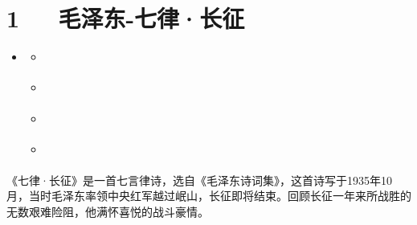 \documentclass[letterpaper,10pt,english]{sphinxmanual}
\begin{document}
\chapter{1   毛泽东-七律·长征}
\label{\detokenize{p01_u6563_u6587/_u6bdb_u6cfd_u4e1c-_u4e03_u5f8b_xb7_u957f_u5f81:id1}}\label{\detokenize{p01_u6563_u6587/_u6bdb_u6cfd_u4e1c-_u4e03_u5f8b_xb7_u957f_u5f81::doc}}
\begin{sphinxShadowBox}
\begin{itemize}
\item {} 
\label{\detokenize{p01_u6563_u6587/_u6bdb_u6cfd_u4e1c-_u4e03_u5f8b_xb7_u957f_u5f81:id7}}{\hyperref[\detokenize{p01_u6563_u6587/_u6bdb_u6cfd_u4e1c-_u4e03_u5f8b_xb7_u957f_u5f81:id1}]{}}
\begin{itemize}
\item {} 
\label{\detokenize{p01_u6563_u6587/_u6bdb_u6cfd_u4e1c-_u4e03_u5f8b_xb7_u957f_u5f81:id8}}{\hyperref[\detokenize{p01_u6563_u6587/_u6bdb_u6cfd_u4e1c-_u4e03_u5f8b_xb7_u957f_u5f81:id3}]{}}

\item {} 
\label{\detokenize{p01_u6563_u6587/_u6bdb_u6cfd_u4e1c-_u4e03_u5f8b_xb7_u957f_u5f81:id9}}{\hyperref[\detokenize{p01_u6563_u6587/_u6bdb_u6cfd_u4e1c-_u4e03_u5f8b_xb7_u957f_u5f81:id4}]{}}

\item {} 
\label{\detokenize{p01_u6563_u6587/_u6bdb_u6cfd_u4e1c-_u4e03_u5f8b_xb7_u957f_u5f81:id10}}{\hyperref[\detokenize{p01_u6563_u6587/_u6bdb_u6cfd_u4e1c-_u4e03_u5f8b_xb7_u957f_u5f81:id5}]{}}

\item {} 
\label{\detokenize{p01_u6563_u6587/_u6bdb_u6cfd_u4e1c-_u4e03_u5f8b_xb7_u957f_u5f81:id11}}{\hyperref[\detokenize{p01_u6563_u6587/_u6bdb_u6cfd_u4e1c-_u4e03_u5f8b_xb7_u957f_u5f81:id6}]{}}

\end{itemize}

\end{itemize}
\end{sphinxShadowBox}

《七律·长征》是一首七言律诗，选自《毛泽东诗词集》，这首诗写于1935年10月，当时毛泽东率领中央红军越过岷山，长征即将结束。回顾长征一年来所战胜的无数艰难险阻，他满怀喜悦的战斗豪情。
\end{document}
